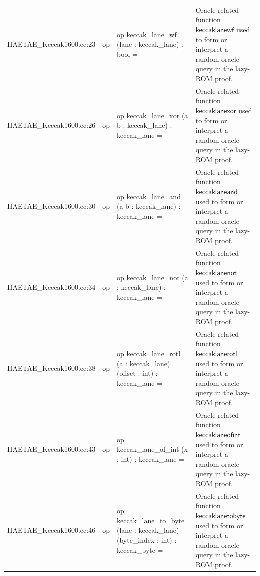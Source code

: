 \documentclass[10pt]{article}
\begin{document}
\begin{longtable}{L{0.11\textwidth}L{0.055\textwidth}L{0.385\textwidth}L{0.41\textwidth}}
HAETAE\_\allowbreak{}Keccak1600.\allowbreak{}ec:\allowbreak{}23 & op & {\ttfamily\scriptsize op keccak\_\allowbreak{}lane\_\allowbreak{}wf (lane : keccak\_\allowbreak{}lane) : bool =} & Oracle-related function $\mathsf{keccaklanewf}$ used to form or interpret a random-oracle query in the lazy-ROM proof. \\
HAETAE\_\allowbreak{}Keccak1600.\allowbreak{}ec:\allowbreak{}26 & op & {\ttfamily\scriptsize op keccak\_\allowbreak{}lane\_\allowbreak{}xor (a b : keccak\_\allowbreak{}lane) : keccak\_\allowbreak{}lane =} & Oracle-related function $\mathsf{keccaklanexor}$ used to form or interpret a random-oracle query in the lazy-ROM proof. \\
HAETAE\_\allowbreak{}Keccak1600.\allowbreak{}ec:\allowbreak{}30 & op & {\ttfamily\scriptsize op keccak\_\allowbreak{}lane\_\allowbreak{}and (a b : keccak\_\allowbreak{}lane) : keccak\_\allowbreak{}lane =} & Oracle-related function $\mathsf{keccaklaneand}$ used to form or interpret a random-oracle query in the lazy-ROM proof. \\
HAETAE\_\allowbreak{}Keccak1600.\allowbreak{}ec:\allowbreak{}34 & op & {\ttfamily\scriptsize op keccak\_\allowbreak{}lane\_\allowbreak{}not (a : keccak\_\allowbreak{}lane) : keccak\_\allowbreak{}lane =} & Oracle-related function $\mathsf{keccaklanenot}$ used to form or interpret a random-oracle query in the lazy-ROM proof. \\
HAETAE\_\allowbreak{}Keccak1600.\allowbreak{}ec:\allowbreak{}38 & op & {\ttfamily\scriptsize op keccak\_\allowbreak{}lane\_\allowbreak{}rotl (a : keccak\_\allowbreak{}lane) (offset : int) : keccak\_\allowbreak{}lane =} & Oracle-related function $\mathsf{keccaklanerotl}$ used to form or interpret a random-oracle query in the lazy-ROM proof. \\
HAETAE\_\allowbreak{}Keccak1600.\allowbreak{}ec:\allowbreak{}43 & op & {\ttfamily\scriptsize op keccak\_\allowbreak{}lane\_\allowbreak{}of\_\allowbreak{}int (x : int) : keccak\_\allowbreak{}lane =} & Oracle-related function $\mathsf{keccaklaneofint}$ used to form or interpret a random-oracle query in the lazy-ROM proof. \\
HAETAE\_\allowbreak{}Keccak1600.\allowbreak{}ec:\allowbreak{}46 & op & {\ttfamily\scriptsize op keccak\_\allowbreak{}lane\_\allowbreak{}to\_\allowbreak{}byte (lane : keccak\_\allowbreak{}lane) (byte\_\allowbreak{}index : int) : keccak\_\allowbreak{}byte =} & Oracle-related function $\mathsf{keccaklanetobyte}$ used to form or interpret a random-oracle query in the lazy-ROM proof. \\

\end{longtable}
\end{document}
